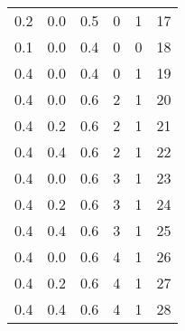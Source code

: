 \begin{table}[H]
\begin{tabular}{rrrrrr}
     0.2 &      0.0 &         0.5 &             0 &                   1 &             17 \\
     0.1 &      0.0 &         0.4 &             0 &                   0 &             18 \\
     0.4 &      0.0 &         0.4 &             0 &                   1 &             19 \\
     0.4 &      0.0 &         0.6 &             2 &                   1 &             20 \\
     0.4 &      0.2 &         0.6 &             2 &                   1 &             21 \\
     0.4 &      0.4 &         0.6 &             2 &                   1 &             22 \\
     0.4 &      0.0 &         0.6 &             3 &                   1 &             23 \\
     0.4 &      0.2 &         0.6 &             3 &                   1 &             24 \\
     0.4 &      0.4 &         0.6 &             3 &                   1 &             25 \\
     0.4 &      0.0 &         0.6 &             4 &                   1 &             26 \\
     0.4 &      0.2 &         0.6 &             4 &                   1 &             27 \\
     0.4 &      0.4 &         0.6 &             4 &                   1 &             28 \\
\bottomrule
\end{tabular}
\end{table}
